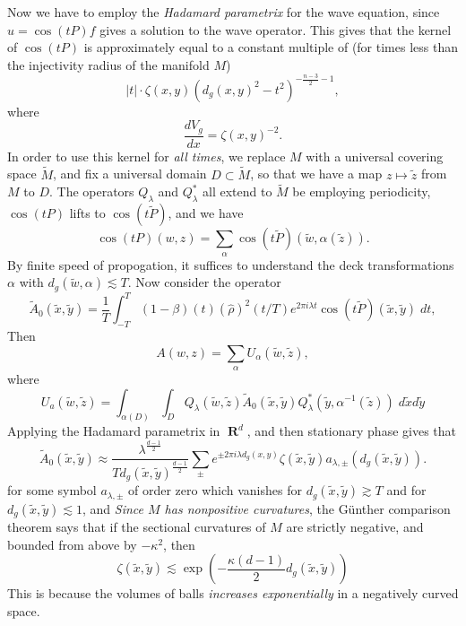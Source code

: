 \documentclass{article}
\DeclareMathOperator{\RR}{\mathbf{R}}
\theoremstyle{plain}
\theoremstyle{remark}
\theoremstyle{definition}
\begin{document}
Now we have to employ the \emph{Hadamard parametrix} for the wave equation, since $u = \cos(tP) f$ gives a solution to the wave operator. This gives that the kernel of $\cos(tP)$ is approximately equal to a constant multiple of (for times less than the injectivity radius of the manifold $M$)
%
\[ |t| \cdot \zeta(x,y) (d_g(x,y)^2 - t^2)^{- \frac{n-3}{2} - 1}, \]
%
where
%
\[ \frac{dV_g}{dx} = \zeta(x,y)^{-2}. \]
%
In order to use this kernel for \emph{all times}, we replace $M$ with a universal covering space $\tilde{M}$, and fix a universal domain $D \subset \tilde{M}$, so that we have a map $z \mapsto \tilde{z}$ from $M$ to $D$. The operators $Q_\lambda$ and $Q_\lambda^*$ all extend to $\tilde{M}$ be employing periodicity, $\cos(tP)$ lifts to $\cos(t \tilde{P})$, and we have
%
\[ \cos(tP)(w,z) = \sum_\alpha \cos(t \tilde{P})(\tilde{w}, \alpha(\tilde{z})). \]
%
By finite speed of propogation, it suffices to understand the deck transformations $\alpha$ with $d_g(\tilde{w}, \alpha) \lesssim T$. Now consider the operator
%
\[ \tilde{A}_0(\tilde{x},\tilde{y}) = \frac{1}{T} \int_{-T}^T (1 - \beta)(t) \left( \widehat{\rho} \right)^2(t/T) e^{2 \pi i \lambda t} \cos(t \tilde{P})(\tilde{x},\tilde{y})\; dt, \]
%
Then
%
\[ A(w,z) = \sum_\alpha U_\alpha(\tilde{w}, \tilde{z}), \]
%
where
%
\[ U_a(\tilde{w}, \tilde{z}) = \int_{\alpha(D)} \int_D Q_\lambda(\tilde{w}, \tilde{z}) \tilde{A}_0(\tilde{x}, \tilde{y}) Q_\lambda^*(\tilde{y}, \alpha^{-1}(\tilde{z}))\; d\tilde{x} d \tilde{y} \]
%
Applying the Hadamard parametrix in $\RR^d$, and then stationary phase gives that
%
\[ \tilde{A}_0(\tilde{x},\tilde{y}) \approx \frac{\lambda^{\frac{d-1}{2}}}{T d_g(\tilde{x}, \tilde{y})^{\frac{d-1}{2}}} \sum_{\pm} e^{\pm 2\pi i \lambda d_g(x,y)} \zeta(\tilde{x}, \tilde{y}) a_{\lambda, \pm}(d_g(\tilde{x}, \tilde{y})). \]
%
for some symbol $a_{\lambda, \pm}$ of order zero which vanishes for $d_g(\tilde{x}, \tilde{y}) \gtrsim T$ and for $d_g(\tilde{x}, \tilde{y}) \lesssim 1$, and
%
%
\emph{Since $M$ has nonpositive curvatures}, the G\"{u}nther comparison theorem says that if the sectional curvatures of $M$ are strictly negative, and bounded from above by $- \kappa^2$, then
%
\[ \zeta(\tilde{x}, \tilde{y}) \lesssim \exp \left( - \frac{\kappa (d-1)}{2} d_g(\tilde{x}, \tilde{y}) \right) \]
%
This is because the volumes of balls \emph{increases exponentially} in a negatively curved space.
\end{document}
